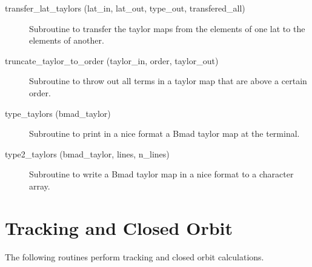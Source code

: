 \begin{description}
\label{r:transfer.lat.taylors}
\item[transfer_lat_taylors (lat_in, lat_out, 
                                             type_out, transfered_all) ] \Newline 
Subroutine to transfer the taylor maps from the elements of one lat to
the elements of another. 

\label{r:truncate.taylor.to.order}
\item[truncate_taylor_to_order (taylor_in, order, taylor_out)] \Newline 
Subroutine to throw out all terms in a taylor map that are above a certain order.

\label{r:type.taylors}
\item[type_taylors (bmad_taylor)] \Newline
Subroutine to print in a nice format a Bmad taylor map at the terminal. 

\label{r:type2.taylors}
\item[type2_taylors (bmad_taylor, lines, n_lines)] \Newline
Subroutine to write a Bmad taylor map in a nice format to a character array. 

\end{description}

\section{Tracking and Closed Orbit}
\label{r:track}    

The following routines perform tracking and closed orbit calculations.

